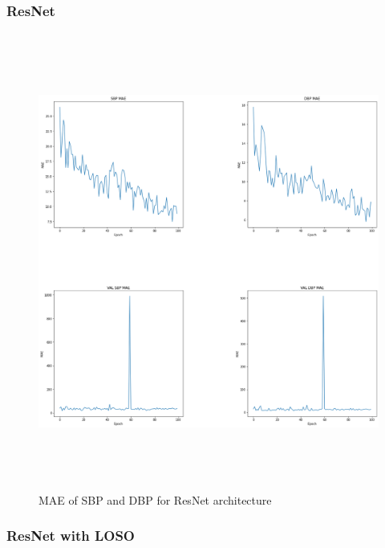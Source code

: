 \subsubsection{ResNet}

\begin{figure}[H]
    \centering
    \includegraphics[width=15cm,height=15cm,keepaspectratio]{Results/resnet.png}
    \caption{MAE of SBP and DBP for ResNet architecture}
    \label{resnetResults}
\end{figure}

\subsubsection{ResNet with LOSO}

